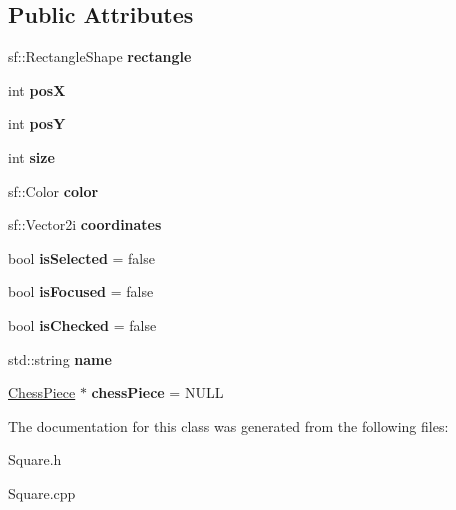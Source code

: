 \subsection*{Public Attributes}
\begin{DoxyCompactItemize}
\item 
\mbox{\label{class_square_a1ec984a2cfe700db6fadaa258487f20f}} 
sf\+::\+Rectangle\+Shape {\bfseries rectangle}
\item 
\mbox{\label{class_square_aa4d8f84fee8c9dcc2b8a24ba8856f18f}} 
int {\bfseries posX}
\item 
\mbox{\label{class_square_a7166f85a192ce8b683fb5b66353af3e7}} 
int {\bfseries posY}
\item 
\mbox{\label{class_square_aae94641867db7a6b4d8558d0462f5f38}} 
int {\bfseries size}
\item 
\mbox{\label{class_square_a77552085b52b855d9d99a6c0d1f5a231}} 
sf\+::\+Color {\bfseries color}
\item 
\mbox{\label{class_square_a88251e1e98ffa491e9aa661eb067776e}} 
sf\+::\+Vector2i {\bfseries coordinates}
\item 
\mbox{\label{class_square_acf73c354b081ef0ca2775e02d875ada0}} 
bool {\bfseries is\+Selected} = false
\item 
\mbox{\label{class_square_aa946d73869ef41e3a14d1888868c4650}} 
bool {\bfseries is\+Focused} = false
\item 
\mbox{\label{class_square_a6ef91a5be2f1e3904973e75ee2115949}} 
bool {\bfseries is\+Checked} = false
\item 
\mbox{\label{class_square_aa9199d2932f26c3ceee6d4101fb6196a}} 
std\+::string {\bfseries name}
\item 
\mbox{\label{class_square_ab67d2941bf8d4a0d2789053acb20e463}} 
\mbox{\hyperlink{class_chess_piece}{Chess\+Piece}} $\ast$ {\bfseries chess\+Piece} = N\+U\+LL
\end{DoxyCompactItemize}


The documentation for this class was generated from the following files\+:\begin{DoxyCompactItemize}
\item 
Square.\+h\item 
Square.\+cpp\end{DoxyCompactItemize}
